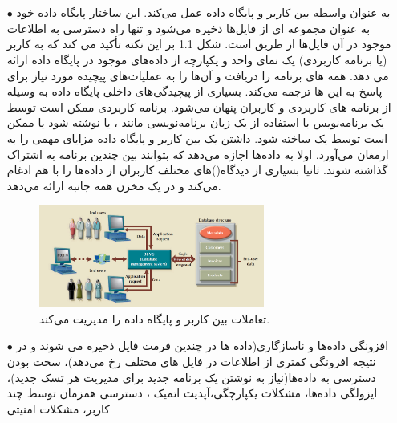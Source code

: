 \documentclass{article}
\begin{document}


\newpage

\section{}
\subsection{}
\begin{itemize}
    \item [$\bullet$]
    به عنوان واسطه بین کاربر و پایگاه داده عمل می‌کند. این ساختار پایگاه داده خود به عنوان مجموعه ای از فایل‌ها ذخیره می‌شود و تنها راه دسترسی به اطلاعات موجود در آن فایل‌ها از طریق 
است.
شکل 1.1 بر این نکته تأکید می کند که
به کاربر (یا برنامه کاربردی) یک نمای واحد و یکپارچه از داده‌های موجود در پایگاه داده ارائه می دهد.
همه 
‌های برنامه را دریافت و آن‌ها را به عملیات‌های پیچیده مورد نیاز برای پاسخ به 
این
‌ها
ترجمه می‌کند.
بسیاری از پیچیدگی‌های داخلی پایگاه داده به وسیله 
از برنامه های کاربردی و کاربران پنهان می‌شود.
برنامه کاربردی ممکن است توسط یک برنامه‌نویس با استفاده از یک زبان برنامه‌نویسی مانند 
	، 
یا
نوشته شود یا ممکن است توسط یک
ساخته شود.
داشتن یک
بین
کاربر و پایگاه داده مزایای مهمی را به ارمغان می‌آورد. اولا
به داده‌ها اجازه می‌دهد که بتوانند بین چندین برنامه به اشتراک گذاشته شوند. ثانیا
بسیاری از دیدگاه()های مختلف کاربران از داده‌ها را با هم ادغام می‌کند و در یک مخزن همه جانبه ارائه می‌دهد.
\begin{figure}[ht]
    \centering
    \includegraphics[width=0.7\textwidth]{figures/1.1.png}
    \caption
	{
تعاملات بین کاربر و پایگاه داده را مدیریت می‌کند.
	}
    \label{fig:fig1}
\end{figure}

    \item [$\bullet$]
افزونگی داده‌ها و ناسازگاری(داده ها در چندین فرمت فایل ذخیره می شوند و در نتیجه افزونگی کمتری از اطلاعات در فایل های مختلف رخ می‌دهد)، سخت بودن دسترسی به داده‌ها(نیاز به نوشتن یک برنامه جدید برای مدیریت هر تسک جدید)، ایزولگی داده‌ها، مشکلات یکپارچگی،آپدیت اتمیک ، دسترسی همزمان توسط چند کاربر، مشکلات امنیتی
\end{itemize}
\end{document}
